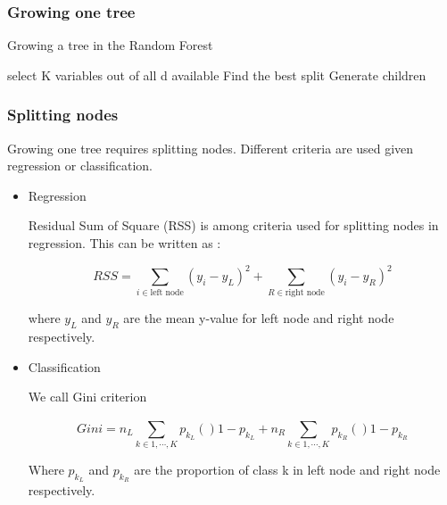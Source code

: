 \documentclass[english,11pt,openany]{report}
\theoremstyle{definition}
\theoremstyle{plain}
\theoremstyle{definition}
\begin{document}
\subsubsection{Growing one tree}

\begin{algorithm}[H]
	\caption{Growing a tree in the Random Forest}\label{algo:RFsplit}
	\begin{algorithmic}[1]
		\State select K variables out of all d available 
		\State Find the best split 
		\State Generate children
		\EndFor
		\EndProcedure
	\end{algorithmic}
\end{algorithm}


\subsubsection{Splitting nodes}

Growing one tree requires splitting nodes. Different criteria are used given regression or classification. 

\begin{itemize}
	\item  Regression

Residual Sum of Square (RSS) is among criteria used for splitting nodes in regression. 
This can be written as : 

\begin{displaymath}
RSS = \sum_{i \in \text{left node}}^{} (y_i - y_L)^2 + \sum_{R \in \text{right node}}^{} (y_i - y_R)^2
\end{displaymath}

where $y_L$ and $y_R$ are the  mean y-value for left node and right node respectively.

%
%

	\item Classification
	
	
	We call Gini criterion 
	
	\begin{displaymath}
	Gini = n_L\sum_{k \in {1, \cdots, K}}^{} p_{k_L} ()1- p_{k_L}  + n_R\sum_{k \in {1, \cdots, K}}^{} p_{k_R} ()1- p_{k_R}
	\end{displaymath}
	
	Where $p_{k_L}$ and $p_{k_R}$ are the proportion of class k in left node and right node respectively.
\end{itemize}
\end{document}
